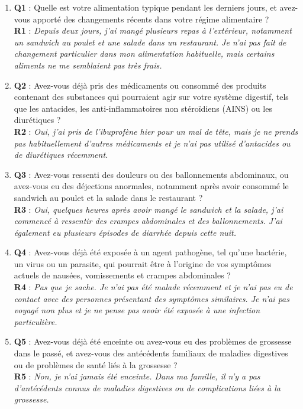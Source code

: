 \documentclass[11pt,a4paper]{report}
\begin{document}
\begin{enumerate}
    \item \textbf{Q1} : Quelle est votre alimentation typique pendant les derniers jours, et avez-vous apporté des changements récents dans votre régime alimentaire ?
    \\ \textbf{R1} : \textit{Depuis deux jours, j'ai mangé plusieurs repas à l'extérieur, notamment un sandwich au poulet et une salade dans un restaurant. Je n'ai pas fait de changement particulier dans mon alimentation habituelle, mais certains aliments ne me semblaient pas très frais.}
    \item \textbf{Q2} : Avez-vous déjà pris des médicaments ou consommé des produits contenant des substances qui pourraient agir sur votre système digestif, tels que les antacides, les anti-inflammatoires non stéroïdiens (AINS) ou les diurétiques ?
    \\ \textbf{R2} : \textit{Oui, j'ai pris de l'ibuprofène hier pour un mal de tête, mais je ne prends pas habituellement d'autres médicaments et je n'ai pas utilisé d'antacides ou de diurétiques récemment.}
    \item \textbf{Q3} : Avez-vous ressenti des douleurs ou des ballonnements abdominaux, ou avez-vous eu des déjections anormales, notamment après avoir consommé le sandwich au poulet et la salade dans le restaurant ?
    \\ \textbf{R3} : \textit{Oui, quelques heures après avoir mangé le sandwich et la salade, j'ai commencé à ressentir des crampes abdominales et des ballonnements. J'ai également eu plusieurs épisodes de diarrhée depuis cette nuit.}
    \item \textbf{Q4} : Avez-vous déjà été exposée à un agent pathogène, tel qu'une bactérie, un virus ou un parasite, qui pourrait être à l'origine de vos symptômes actuels de nausées, vomissements et crampes abdominales ?
    \\ \textbf{R4} : \textit{Pas que je sache. Je n’ai pas été malade récemment et je n’ai pas eu de contact avec des personnes présentant des symptômes similaires. Je n’ai pas voyagé non plus et je ne pense pas avoir été exposée à une infection particulière.}
    \item \textbf{Q5} : Avez-vous déjà été enceinte ou avez-vous eu des problèmes de grossesse dans le passé, et avez-vous des antécédents familiaux de maladies digestives ou de problèmes de santé liés à la grossesse ?
    \\ \textbf{R5} : \textit{Non, je n’ai jamais été enceinte. Dans ma famille, il n’y a pas d’antécédents connus de maladies digestives ou de complications liées à la grossesse.}
\end{enumerate}
\end{document}
